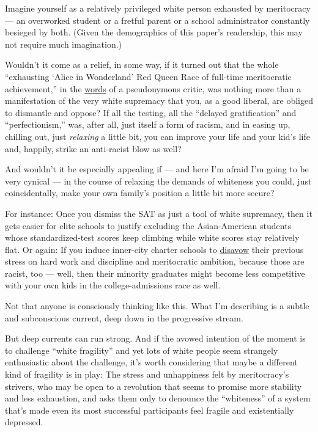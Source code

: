 Imagine yourself as a relatively privileged white person exhausted by
meritocracy --- an overworked student or a fretful parent or a school
administrator constantly besieged by both. (Given the demographics of
this paper's readership, this may not require much imagination.)

Wouldn't it come as a relief, in some way, if it turned out that the
whole ``exhausting `Alice in Wonderland' Red Queen Race of full-time
meritocratic achievement,'' in the
\href{https://americanmind.org/features/the-death-of-virtue-and-the-rise-of-expertise/waking-from-meritocracy/}{words}
of a pseudonymous critic, was nothing more than a manifestation of the
very white supremacy that you, as a good liberal, are obliged to
dismantle and oppose? If all the testing, all the ``delayed
gratification'' and ``perfectionism,'' was, after all, just itself a
form of racism, and in easing up, chilling out, just \emph{relaxing} a
little bit, you can improve your life and your kid's life and, happily,
strike an anti-racist blow as well?

And wouldn't it be especially appealing if --- and here I'm afraid I'm
going to be very cynical --- in the course of relaxing the demands of
whiteness you could, just coincidentally, make your own family's
position a little bit more secure?

For instance: Once you dismiss the SAT as just a tool of white
supremacy, then it gets easier for elite schools to justify excluding
the Asian-American students whose standardized-test scores keep climbing
while white scores stay relatively flat. Or again: If you induce
inner-city charter schools to
\href{https://www.kipp.org/words-into-action/}{disavow} their previous
stress on hard work and discipline and meritocratic ambition, because
those are racist, too --- well, then their minority graduates might
become less competitive with your own kids in the college-admissions
race as well.

Not that anyone is consciously thinking like this. What I'm describing
is a subtle and subconscious current, deep down in the progressive
stream.

But deep currents can run strong. And if the avowed intention of the
moment is to challenge ``white fragility'' and yet lots of white people
seem strangely enthusiastic about the challenge, it's worth considering
that maybe a different kind of fragility is in play: The stress and
unhappiness felt by meritocracy's strivers, who may be open to a
revolution that seems to promise more stability and less exhaustion, and
asks them only to denounce the ``whiteness'' of a system that's made
even its most successful participants feel fragile and existentially
depressed.

